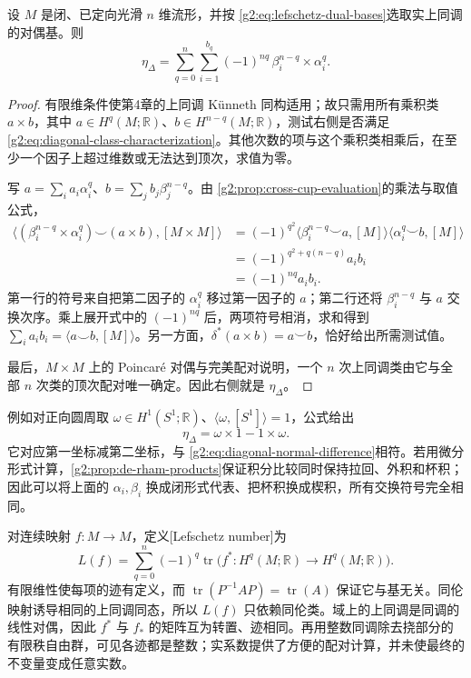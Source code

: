 \begin{proposition}\label{g2:prop:diagonal-class-expansion}
	设 \(M\) 是闭、已定向光滑 \(n\) 维流形，并按 \eqref{g2:eq:lefschetz-dual-bases}选取实上同调的对偶基。则
	\begin{equation}\label{g2:eq:diagonal-class-expansion}
		\eta_\Delta
		=\sum_{q=0}^n\sum_{i=1}^{b_q}
			(-1)^{nq}\,\beta_i^{n-q}\times\alpha_i^q.
	\end{equation}
\end{proposition}
\begin{proof}
	有限维条件使第4章的上同调 Künneth 同构适用；故只需用所有乘积类 \(a\times b\)，其中 \(a\in H^q(M;\mathbb R)\)、\(b\in H^{n-q}(M;\mathbb R)\)，测试右侧是否满足 \eqref{g2:eq:diagonal-class-characterization}。其他次数的项与这个乘积类相乘后，在至少一个因子上超过维数或无法达到顶次，求值为零。

	写 \(a=\sum_i a_i\alpha_i^q\)、\(b=\sum_j b_j\beta_j^{n-q}\)。由 \cref{g2:prop:cross-cup-evaluation}的乘法与取值公式，
	\begin{align*}
		\bigl\langle(\beta_i^{n-q}\times\alpha_i^q)\smile(a\times b),[M\times M]\bigr\rangle
		&=(-1)^{q^2}\langle\beta_i^{n-q}\smile a,[M]\rangle
			\langle\alpha_i^q\smile b,[M]\rangle\\
		&=(-1)^{q^2+q(n-q)}a_i b_i\\
		&=(-1)^{nq}a_i b_i.
	\end{align*}
	第一行的符号来自把第二因子的 \(\alpha_i^q\) 移过第一因子的 \(a\)；第二行还将 \(\beta_i^{n-q}\) 与 \(a\) 交换次序。乘上展开式中的 \((-1)^{nq}\) 后，两项符号相消，求和得到 \(\sum_i a_i b_i=\langle a\smile b,[M]\rangle\)。另一方面，\(\delta^*(a\times b)=a\smile b\)，恰好给出所需测试值。

	最后，\(M\times M\) 上的 Poincaré 对偶与完美配对说明，一个 \(n\) 次上同调类由它与全部 \(n\) 次类的顶次配对唯一确定。因此右侧就是 \(\eta_\Delta\)。
\end{proof}

例如对正向圆周取 \(\omega\in H^1(S^1;\mathbb R)\)、\(\langle\omega,[S^1]\rangle=1\)，公式给出
\[
	\eta_\Delta=\omega\times1-1\times\omega.
\]
它对应第一坐标减第二坐标，与 \eqref{g2:eq:diagonal-normal-difference}相符。若用微分形式计算，\cref{g2:prop:de-rham-products}保证积分比较同时保持拉回、外积和杯积；因此可以将上面的 \(\alpha_i,\beta_i\) 换成闭形式代表、把杯积换成楔积，所有交换符号完全相同。

\ProseParagraphBreak

对连续映射 \(f:M\to M\)，定义[Lefschetz number]为
\begin{equation}\label{g2:eq:lefschetz-number}
	L(f)=\sum_{q=0}^n(-1)^q
		\operatorname{tr}\bigl(f^*:H^q(M;\mathbb R)\to H^q(M;\mathbb R)\bigr).
\end{equation}
有限维性使每项的迹有定义，而 \(\operatorname{tr}(P^{-1}AP)=\operatorname{tr}(A)\) 保证它与基无关。同伦映射诱导相同的上同调同态，所以 \(L(f)\) 只依赖同伦类。域上的上同调是同调的线性对偶，因此 \(f^*\) 与 \(f_*\) 的矩阵互为转置、迹相同。再用整数同调除去挠部分的有限秩自由群，可见各迹都是整数；实系数提供了方便的配对计算，并未使最终的不变量变成任意实数。

